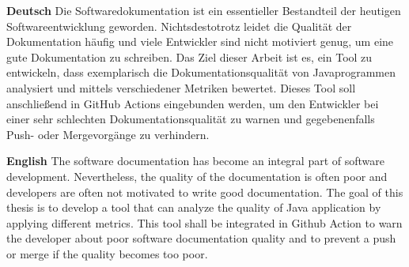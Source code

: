 \textbf{Deutsch}
Die Softwaredokumentation ist ein essentieller Bestandteil der heutigen Softwareentwicklung geworden. Nichtsdestotrotz leidet die Qualität der Dokumentation häufig und viele Entwickler sind nicht motiviert genug, um eine gute Dokumentation zu schreiben. Das Ziel dieser Arbeit ist es, ein Tool zu entwickeln, dass exemplarisch die Dokumentationsqualität von Javaprogrammen analysiert und mittels verschiedener Metriken bewertet. Dieses Tool soll anschließend in GitHub Actions eingebunden werden, um den Entwickler bei einer sehr schlechten Dokumentationsqualität zu warnen und gegebenenfalls Push- oder Mergevorgänge zu verhindern.

\bigskip

\noindent
\textbf{English} 
The software documentation has become an integral part of software development. Nevertheless, the quality of the documentation is often poor and developers are often not motivated to write good documentation. The goal of this thesis is to develop a tool that can analyze the quality of Java application by applying different metrics. This tool shall be integrated in Github Action to warn the developer about poor software documentation quality and to prevent a push or merge if the quality becomes too poor.  

